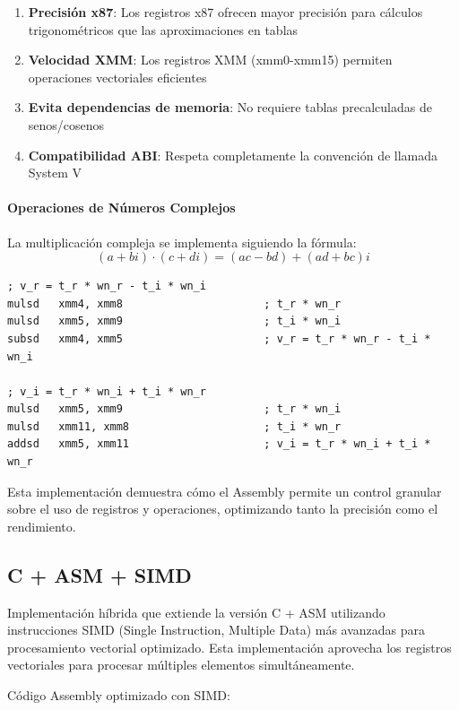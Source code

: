 \documentclass[a4paper]{article}
\begin{document}
\begin{enumerate}
    \item \textbf{Precisión x87}: Los registros x87 ofrecen mayor precisión para cálculos trigonométricos que las aproximaciones en tablas
    \item \textbf{Velocidad XMM}: Los registros XMM (xmm0-xmm15) permiten operaciones vectoriales eficientes
    \item \textbf{Evita dependencias de memoria}: No requiere tablas precalculadas de senos/cosenos
    \item \textbf{Compatibilidad ABI}: Respeta completamente la convención de llamada System V
\end{enumerate}

\paragraph{Operaciones de Números Complejos}

La multiplicación compleja se implementa siguiendo la fórmula:
$$(a + bi) \cdot (c + di) = (ac - bd) + (ad + bc)i$$

\begin{verbatim}
; v_r = t_r * wn_r - t_i * wn_i
mulsd   xmm4, xmm8                      ; t_r * wn_r
mulsd   xmm5, xmm9                      ; t_i * wn_i
subsd   xmm4, xmm5                      ; v_r = t_r * wn_r - t_i * wn_i

; v_i = t_r * wn_i + t_i * wn_r
mulsd   xmm5, xmm9                      ; t_r * wn_i
mulsd   xmm11, xmm8                     ; t_i * wn_r
addsd   xmm5, xmm11                     ; v_i = t_r * wn_i + t_i * wn_r
\end{verbatim}

Esta implementación demuestra cómo el Assembly permite un control granular sobre el uso de registros y operaciones, optimizando tanto la precisión como el rendimiento.

\subsection{C + ASM + SIMD}

Implementación híbrida que extiende la versión C + ASM utilizando instrucciones SIMD (Single Instruction, Multiple Data) más avanzadas para procesamiento vectorial optimizado.
Esta implementación aprovecha los registros vectoriales para procesar múltiples elementos simultáneamente.

Código Assembly optimizado con SIMD:
\begin{verbatim}
\end{verbatim}
\end{document}
